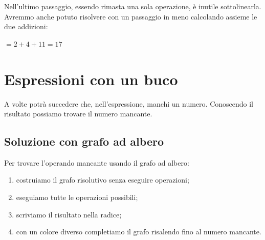 Nell'ultimo passaggio, essendo rimasta una sola operazione, è inutile 
sottolinearla. Avremmo anche potuto risolvere con un passaggio in meno
calcolando assieme le due addizioni:

\(= 2 + 4 + 11 = 17\)

\section{Espressioni con un buco}
\label{sec:nat_espressioni_buco}

A volte potrà succedere che, nell'espressione, manchi un numero.
Conoscendo il risultato possiamo trovare il numero mancante.

\subsection{Soluzione con grafo ad albero}

\begin{procedura}
 Per trovare l'operando mancante usando il grafo ad albero:
\begin{enumerate} [noitemsep]
 \item costruiamo il grafo risolutivo senza eseguire operazioni;
 \item eseguiamo tutte le operazioni possibili;
 \item scriviamo il risultato nella radice;
 \item con un colore diverso completiamo il grafo risalendo fino al numero 
  mancante.
\end{enumerate}
\end{procedura}

